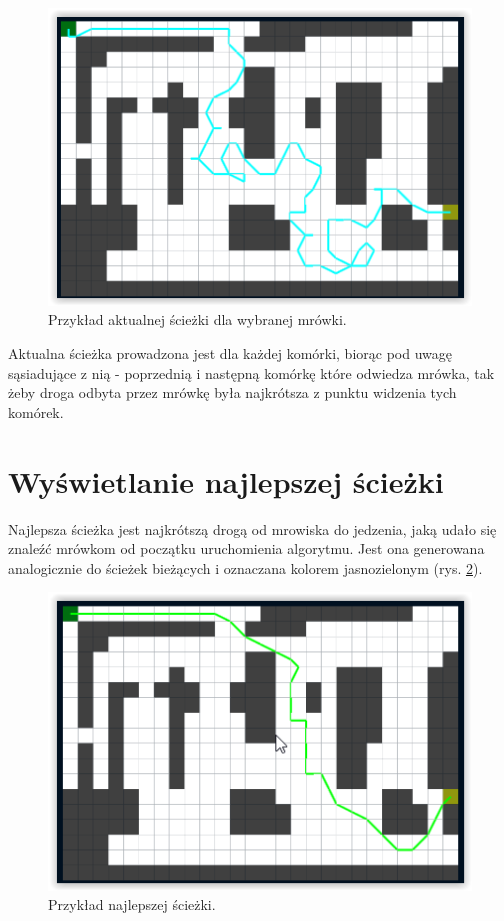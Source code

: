 \documentclass[printmode, openany, oneside, eng]{mgr}
\begin{document}
\begin{figure}[!h]
\centering
\includegraphics[scale=1]{img/sciezki1.png}
\caption{Przykład aktualnej ścieżki dla wybranej mrówki.}
\label{fig:sciezki1}
\end{figure}

Aktualna ścieżka prowadzona jest dla każdej komórki, biorąc pod uwagę sąsiadujące z nią - poprzednią i następną komórkę które odwiedza mrówka, tak żeby droga odbyta przez mrówkę była najkrótsza z punktu widzenia tych komórek.

\section{Wyświetlanie najlepszej ścieżki}\label{sec:mapaNajSciezka}

Najlepsza ścieżka jest najkrótszą drogą od mrowiska do jedzenia, jaką udało się znaleźć mrówkom od początku uruchomienia algorytmu. Jest ona generowana analogicznie do ścieżek bieżących i oznaczana kolorem jasnozielonym (rys. \ref{fig:sciezki2}).

\begin{figure}[!h]
\centering
\includegraphics[scale=1]{img/sciezki2.png}
\caption{Przykład najlepszej ścieżki.}
\label{fig:sciezki2}
\end{figure}
\end{document}
